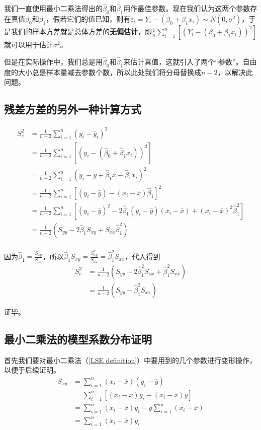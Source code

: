 \documentclass[UTF8]{ctexbook}
\begin{document}
我们一直使用最小二乘法得出的$\hat\beta_0$和$\hat\beta_1$用作最佳参数。现在我们认为这两个参数存在真值$\beta_0$和$\beta_1$，假若它们的值已知，则有$\varepsilon_i=Y_i-(\beta_0+\beta_1x_i)\sim N(0,\sigma^2)$，于是我们的样本方差就是总体方差的\textbf{无偏估计}，即$\frac{1}{n}\sum_{i=1}^n[(Y_i-(\beta_0+\beta_1x_i))^2]$就可以用于估计$\sigma^2$。

但是在实际操作中，我们总是用$\hat\beta_0$和$\hat\beta_1$来估计真值，这就引入了两个“参数”。自由度的大小总是样本量减去参数个数，所以此处我们将分母替换成$n-2$，以解决此问题。

\subsection{残差方差的另外一种计算方式}
\label{proof16}
\begin{align*}
	S_e^2&=\frac{1}{n-2}\sum_{i=1}^n(y_i-\hat y_i)^2\\
	&=\frac{1}{n-2}\sum_{i=1}^n[(y_i-(\hat\beta_0+\hat\beta_1x_i))^2]\\
	&=\frac{1}{n-2}\sum_{i=1}^n(y_i-\bar y+\hat\beta_1\bar x-\hat\beta_1x_i)^2\\
	&=\frac{1}{n-2}\sum_{i=1}^n[(y_i-\hat y)-(x_i-\bar x)\hat\beta_1]^2\\
	&=\frac{1}{n-2}\sum_{i=1}^n[(y_i-\bar y)^2-2\hat\beta_1(y_i-\hat y)(x_i-\bar x)+(x_i-\bar x)^2\hat\beta_1^2]\\
	&=\frac{1}{n-2}(S_{yy}-2\hat\beta_1S_{xy}+S_{xx}\hat\beta_1^2)\\
\end{align*}

因为$\hat\beta_1=\frac{S_{xy}}{S_{xx}}$，所以$\hat\beta_1S_{xy}=\frac{S_{xy}^2}{S_{xx}}=\hat\beta_1^2S_{xx}$，代入得到
\begin{align*}
	S_e^2&=\frac{1}{n-2}(S_{yy}-2\hat\beta_1^2S_{xx}+\hat\beta_1^2S_{xx})\\
	&=\frac{1}{n-2}(S_{yy}-\hat\beta_1^2S_{xx})
\end{align*}

证毕。

\subsection{最小二乘法的模型系数分布证明}
\label{proof17}
首先我们要对最小二乘法（\ref{LSE definition}）中要用到的几个参数进行变形操作，以便于后续证明。
\begin{align*}
	S_{xy}&=\sum_{i=1}^n(x_i-\bar x)(y_i-\bar y)\\
	&=\sum_{i=1}^n[(x_i-\bar x)y_i-(x_i-\bar x)\bar y]\\
	&=\sum_{i=1}^n(x_i-\bar x)y_i-\bar y\sum_{i=1}^n(x_i-\bar x)\\
	&=\sum_{i=1}^n(x_i-\bar x)y_i
\end{align*}
\end{document}

